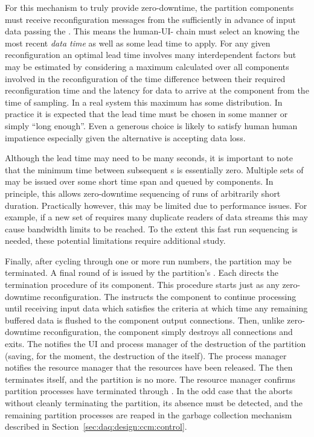 For this mechanism to truly provide zero-downtime, the partition components must receive reconfiguration messages from the  sufficiently in advance of input data passing the .
This means the human-UI- chain must select an  knowing the most recent \textit{data time} as well as some lead time to apply.  
For any given reconfiguration an optimal lead time involves many interdependent factors but may be estimated by considering a maximum calculated over all components involved in the reconfiguration of the time difference between their required reconfiguration time and the latency for data to arrive at the component from the time of sampling. 
In a real system this maximum has some distribution. 
In practice it is expected that the lead time must be chosen in some %
manner or simply ``long enough''.
Even a generous choice is likely to satisfy human human impatience especially given the alternative is accepting data loss.

Although the lead time may need to be many seconds, it is important to note that the minimum time between subsequent s is essentially zero. 
Multiple sets of  may be issued over some short time span and queued by components. 
In principle, this allows zero-downtime sequencing of runs of arbitrarily short duration.
Practically however, this may be limited due to performance issues. 
For example, if a new set of  requires many duplicate readers of data streams this may cause bandwidth limits to be reached. 
To the extent this fast run sequencing is needed, these potential limitations require additional study.

Finally, after cycling through one or more run numbers, the partition may be terminated. 
A final round of  is issued by the partition's . 
Each  directs the termination procedure of its component. 
This procedure starts just as any zero-downtime reconfiguration. 
The  instructs the component to continue processing until receiving input data which satisfies the  criteria at which time any remaining buffered data is flushed to the component output connections. 
Then, unlike zero-downtime reconfiguration, the component simply destroys all connections and exits. 
The  notifies the UI and process manager of the destruction of the partition (saving, for the moment, the destruction of the  itself). 
The process manager notifies the resource manager that the resources have been released. 
The  then terminates itself, and the partition is no more.
The resource manager confirms partition processes have terminated through . 
In the odd case that the  aborts without cleanly terminating the partition, its absence must be detected, and the remaining partition processes are reaped in the garbage collection mechanism described in Section~\ref{sec:daq:design:ccm:control}.

